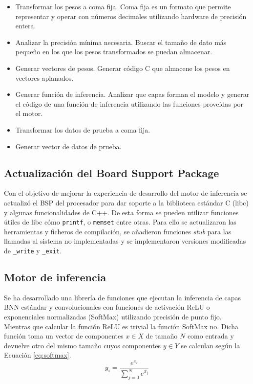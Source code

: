 \begin{itemize}
    \item Transformar los pesos a coma fija. Coma fija es un formato que permite representar y operar con números decimales utilizando hardware de precisión entera.
    \item Analizar la precisión mínima necesaria. Buscar el tamaño de dato más pequeño en los que los pesos transformados se puedan almacenar. \todo
    \item Generar vectores de pesos. Generar código C que almacene los pesos en vectores aplanados.
    \item Generar función de inferencia. Analizar que capas forman el modelo y generar el código de una función de inferencia utilizando las funciones proveídas por el motor.
    \item Transformar los datos de prueba a coma fija.
    \item Generar vector de datos de prueba.
\end{itemize}

\subsection{Actualización del Board Support Package}

Con el objetivo de mejorar la experiencia de desarrollo del motor de inferencia se actualizó el BSP del procesador para dar soporte a la biblioteca estándar C (libc) y algunas funcionalidades de C++. De esta forma se pueden utilizar funciones útiles de libc cómo \texttt{printf}, o \texttt{memset} entre otras. Para ello se actualizaron las herramientas y ficheros de compilación, se añadieron funciones \textit{stub} para las llamadas al sistema no implementadas y se implementaron versiones modificadas de \texttt{\_write} y \texttt{\_exit}.

\subsection{Motor de inferencia} \label{sec:motor_inferencia_c}

Se ha desarrollado una librería de funciones que ejecutan la inferencia de capas BNN estándar y convolucionales con funciones de activación ReLU o exponenciales normalizadas (SoftMax) utilizando precisión de punto fijo. Mientras que calcular la función ReLU es trivial la función SoftMax no. Dicha función toma un vector de componentes $x \in X$ de tamaño $N$ como entrada y devuelve otro del mismo tamaño cuyos componentes $y\in Y$ se calculan según la Ecuación \ref{eq:softmax}.
\begin{equation} \label{eq:softmax}
y_i = \dfrac{e^{x_i}}{\sum_{j = 0}^N e^{x_j}}
\end{equation}

